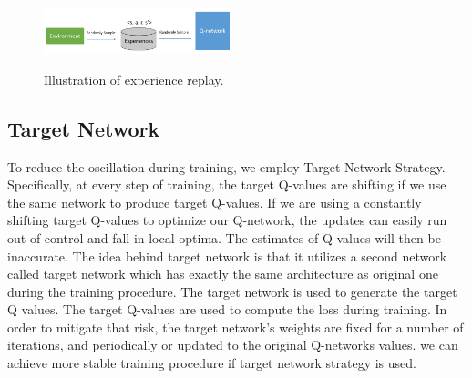 \begin{figure}[ht!]
	\centering
	\includegraphics[width=0.49\textwidth]{./fig/experience_replay.png} \\
	\caption{Illustration of experience replay.}
	\label{fig:experience_replay}
\end{figure}

\subsection{Target Network}
To reduce the oscillation during training, we employ Target Network Strategy\cite{lillicrap2015continuous}.
%
Specifically, at every step of training, the target Q-values are shifting if we use the same network to produce target Q-values.
%
If we are using a constantly shifting target Q-values to optimize our Q-network, the updates can easily run out of control and fall in local optima. The estimates of Q-values will then be inaccurate.
%
The idea behind target network is that it utilizes a second network called target network which has exactly the same architecture as original one during the training procedure.
%
The target network is used to generate the target Q values. The target Q-values are used to compute the loss during training.
%
In order to mitigate that risk, the target network’s weights are fixed for a number of iterations, and periodically or updated to the original Q-networks values. 
%
we can achieve more stable training procedure if target network strategy is used.


